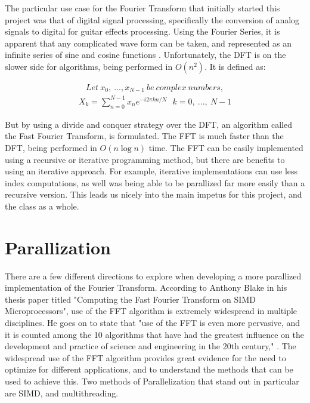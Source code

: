 \documentclass[12pt]{extarticle}
\begin{document}
    The particular use case for the Fourier Transform that initially started this project was that of  digital signal processing, specifically the conversion of analog signals to digital for guitar effects processing.
    Using the Fourier Series, it is apparent that any complicated wave form can be taken,
    and represented as an infinite series of sine and cosine functions \cite{Liu:2021}.
    Unfortunately, the DFT is on the slower side for algorithms, being performed in $O(n^2)$.
    It is defined as:
    
	\begin{align*}
		Let\ x_{0},\ ..., x_{N-1}\ be\ complex\ numbers,
	\end{align*}
	\begin{align}
		X_{k} = \sum_{n=0}^{N-1}x_{n}e^{-i 2 \pi k n / N}\ \ \ k = 0,\ ...,\ N-1
    \end{align}

    But by using a divide and conquer strategy over the DFT, an algorithm called the Fast Fourier Transform, is formulated.
	The FFT is much faster than the DFT, being performed in $O(n\log{}n)$ time. The FFT can be easily implemented using a recursive or iterative programming method, but there are benefits to using an iterative approach. 
    For example, iterative implementations can use less index computations, as well was being able to be parallized far more easily than a recursive version.
    This leads us nicely into the main impetus for this project, and the class as a whole.

\maketitle
\newpage
\section*{Parallization} 
    
    There are a few different directions to explore when developing a more
    parallized implementation of the Fourier Transform. 
    According to Anthony Blake in his thesis paper titled "Computing the Fast Fourier Transform on SIMD Microprocessors",
    use of the FFT algorithm is extremely widespread in multiple disciplines. He goes on to state that 
    "use of the FFT is even more pervasive, and it is counted among the 10 algorithms that have had the greatest influence 
    on the development and practice of science and engineering in the 20th century," \cite{Blake:2012}.
    The widespread use of the FFT algorithm provides great evidence for the need to optimize for different applications,
    and to understand the methods that can be used to achieve this.
    Two methods of Parallelization that stand out in particular are SIMD, and multithreading.
\end{document}
